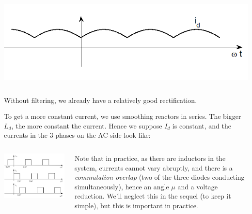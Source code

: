 \begin{frame}
\begin{columns}
\begin{column}{0.5\linewidth}
\begin{center}
\end{center}
\begin{center}
    \includegraphics[width=0.7\linewidth]{images/3pulseired.png}
\end{center}
\end{column}
\end{columns}
Without filtering, we already have a relatively good rectification.
\end{frame}

\begin{frame}
To get a more constant current, we use smoothing reactors in series. The bigger $L_d$, the more constant the current.
Hence we suppose $I_d$ is constant, and the currents in the 3 phases on the AC side look like:
\begin{columns}
\begin{column}{0.5\linewidth}
\begin{center}
    \includegraphics[width=\linewidth]{images/currents3pulse.png}
\end{center}
\end{column}
\begin{column}{0.5\linewidth}
Note that in practice, as there are inductors in the system, currents cannot vary abruptly, and there is a \textit{commutation overlap} (two of the three diodes conducting simultaneously), hence an angle $\mu$ and a voltage reduction. We'll neglect this in the sequel (to keep it simple), but this is important in practice.
\end{column}
\end{columns}
\end{frame}

